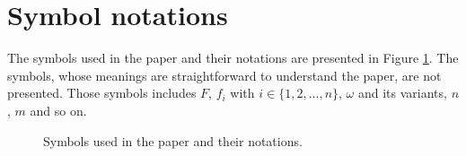 \documentclass[letterpaper]{article}
\begin{document}
%





\newtheorem{Theorem}{\bf{Theorem}}
\newtheorem{Assumption}{\bf{Assumption}}
\newtheorem{Lemma}{\bf{Lemma}}
\newtheorem{Corollary}{\bf{Corollary}}

\section{Symbol notations}
\label{sect_notations}
The symbols used in the paper and their notations are presented in Figure \ref{symbol_notations}. The symbols, whose meanings are straightforward to understand  the paper, are not presented. Those symbols includes $F$, $f_i$ with $i\in\{1,2, ..., n\}$, $\omega$ and its variants, $n$, $m$ and so on.
\begin{figure}
\centering
{}
\caption{Symbols used in the paper and their notations.}
\label{symbol_notations}
\end{figure}
\end{document}
